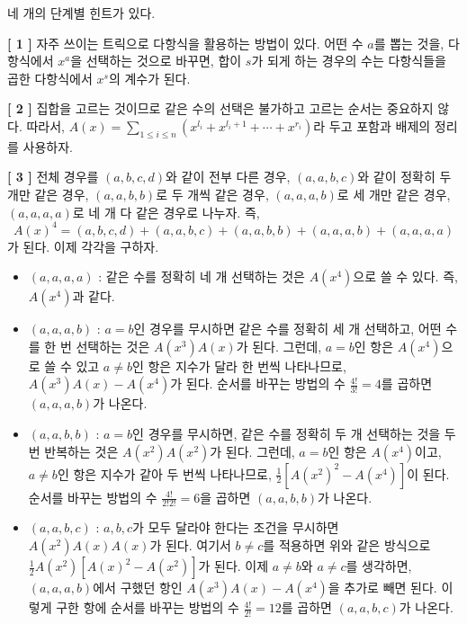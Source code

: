 \begin{hint}
    네 개의 단계별 힌트가 있다.

    \textbf{[ 1 ]}
    자주 쓰이는 트릭으로 다항식을 활용하는 방법이 있다. 어떤 수 $a$를 뽑는 것을, 다항식에서 $x^a$을 선택하는 것으로 바꾸면, 합이 $s$가 되게 하는 경우의 수는 다항식들을 곱한 다항식에서 $x^s$의 계수가 된다.

    \textbf{[ 2 ]}
    집합을 고르는 것이므로 같은 수의 선택은 불가하고 고르는 순서는 중요하지 않다. 따라서, $A(x) = \sum_{1 \leq i \leq n} {\left(x^{l_i} + x^{l_i+1} + \cdots + x^{r_i}\right)}$라 두고 포함과 배제의 정리를 사용하자.

    \textbf{[ 3 ]}
    전체 경우를 $(a, b, c, d)$와 같이 전부 다른 경우, $(a, a, b, c)$와 같이 정확히 두 개만 같은 경우, $(a, a, b, b)$로 두 개씩 같은 경우, $(a, a, a, b)$로 세 개만 같은 경우, $(a, a, a, a)$로 네 개 다 같은 경우로 나누자. 즉,
    $$A(x)^4 = (a, b, c, d) + (a, a, b, c) + (a, a, b, b) + (a, a, a, b) + (a, a, a, a)$$
    가 된다. 이제 각각을 구하자.
    
    \begin{itemize}
        \item $(a, a, a, a)$ : 같은 수를 정확히 네 개 선택하는 것은 $A(x^4)$으로 쓸 수 있다. 즉, $A(x^4)$과 같다.
        \item $(a, a, a, b)$ : $a=b$인 경우를 무시하면 같은 수를 정확히 세 개 선택하고, 어떤 수를 한 번 선택하는 것은 $A(x^3)A(x)$가 된다. 그런데, $a=b$인 항은 $A(x^4)$으로 쓸 수 있고 $a \neq b$인 항은 지수가 달라 한 번씩 나타나므로, $A(x^3)A(x) - A(x^4)$가 된다. 순서를 바꾸는 방법의 수 $\frac{4!}{3!} = 4$를 곱하면 $(a, a, a, b)$가 나온다.
        \item $(a, a, b, b)$ : $a=b$인 경우를 무시하면, 같은 수를 정확히 두 개 선택하는 것을 두 번 반복하는 것은 $A(x^2)A(x^2)$가 된다. 그런데, $a=b$인 항은 $A(x^4)$이고, $a \neq b$인 항은 지수가 같아 두 번씩 나타나므로, $\frac{1}{2}\left[A(x^2)^2 - A(x^4)\right]$이 된다. 순서를 바꾸는 방법의 수 $\frac{4!}{2!2!} = 6$을 곱하면 $(a, a, b, b)$가 나온다.
        \item $(a, a, b, c)$ : $a, b, c$가 모두 달라야 한다는 조건을 무시하면 $A(x^2)A(x)A(x)$가 된다. 여기서 $b \neq c$를 적용하면 위와 같은 방식으로 $\frac{1}{2} A(x^2) \left[ A(x)^2 - A(x^2) \right]$가 된다. 이제 $a \neq b$와 $a \neq c$를 생각하면, $(a, a, a, b)$에서 구했던 항인 $A(x^3)A(x) - A(x^4)$을 추가로 빼면 된다. 이렇게 구한 항에 순서를 바꾸는 방법의 수 $\frac{4!}{2!} = 12$를 곱하면 $(a, a, b, c)$가 나온다.
    \end{itemize}


\end{hint}
